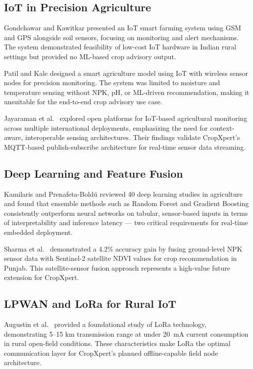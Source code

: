 \documentclass[10pt,twocolumn]{article}
\begin{document}
\subsection{IoT in Precision Agriculture}

Gondchawar and Kawitkar \cite{gondchawar2016} presented an IoT smart farming system using GSM and GPS alongside soil sensors, focusing on monitoring and alert mechanisms. The system demonstrated feasibility of low-cost IoT hardware in Indian rural settings but provided no ML-based crop advisory output.

Patil and Kale \cite{patil2016} designed a smart agriculture model using IoT with wireless sensor nodes for precision monitoring. The system was limited to moisture and temperature sensing without NPK, pH, or ML-driven recommendation, making it unsuitable for the end-to-end crop advisory use case.

Jayaraman et al.\ \cite{jayaraman2016} explored open platforms for IoT-based agricultural monitoring across multiple international deployments, emphasizing the need for context-aware, interoperable sensing architectures. Their findings validate CropXpert's MQTT-based publish-subscribe architecture for real-time sensor data streaming.

\subsection{Deep Learning and Feature Fusion}

Kamilaris and Prenafeta-Bold{\'u} \cite{kamilaris2018} reviewed 40 deep learning studies in agriculture and found that ensemble methods such as Random Forest and Gradient Boosting consistently outperform neural networks on tabular, sensor-based inputs in terms of interpretability and inference latency --- two critical requirements for real-time embedded deployment.

Sharma et al.\ \cite{sharma2021} demonstrated a 4.2\% accuracy gain by fusing ground-level NPK sensor data with Sentinel-2 satellite NDVI values for crop recommendation in Punjab. This satellite-sensor fusion approach represents a high-value future extension for CropXpert.

\subsection{LPWAN and LoRa for Rural IoT}

Augustin et al.\ \cite{augustin2016} provided a foundational study of LoRa technology, demonstrating 5--15 km transmission range at under 20~mA current consumption in rural open-field conditions. These characteristics make LoRa the optimal communication layer for CropXpert's planned offline-capable field node architecture.
\end{document}
